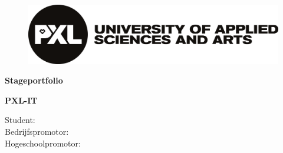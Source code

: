 \documentclass[a4paper]{article}
\begin{document}

  \begin{titlepage}
    \begin{figure}
      \includegraphics[width=0.5\linewidth]{images/logo_PXL_University_of_applied_sciences_and_arts.png}
    \end{figure}
    \begin{center}
      \vspace*{0.5cm}
      \Huge\textbf{\textcolor{pxlgreen}{Stageportfolio}}
      \par
      \vspace{0.5cm}
      \Large\textbf{\textcolor{pxlgreen}{PXL-IT}}
      \par
      \vspace{2.5cm}
      \normalsize\textbf{\stagebedrijf}
      \par
    \end{center}
    \vspace{2.5cm}
    \begin{tabbing}
      Student: ~~~~~~~~~~~~~~~ \= \textbf{\student}\\
      Bedrijfspromotor: \> \textbf{\bedrijfspromotor}\\
      Hogeschoolpromotor: \> \textbf{\pxlpromotor}
    \end{tabbing}
    \vfill
  \end{titlepage}

  \begingroup
  \hypersetup{linkcolor=black}
  \tableofcontents
  \endgroup

\end{document}
